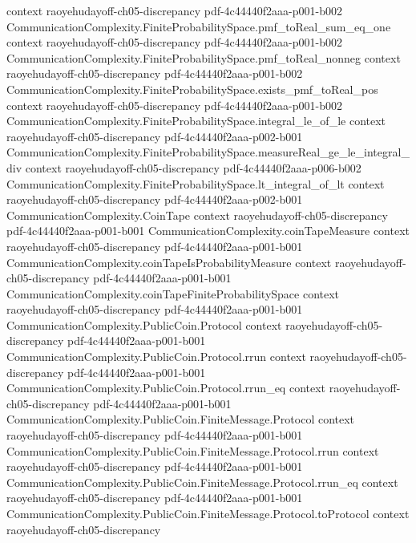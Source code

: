 \begin{theorem}
  {context}
  {raoyehudayoff-ch05-discrepancy}
  {pdf-4c44440f2aaa-p001-b002}
\proofstep
  {CommunicationComplexity.FiniteProbabilitySpace.pmf_toReal_sum_eq_one}
  {context}
  {raoyehudayoff-ch05-discrepancy}
  {pdf-4c44440f2aaa-p001-b002}
\proofstep
  {CommunicationComplexity.FiniteProbabilitySpace.pmf_toReal_nonneg}
  {context}
  {raoyehudayoff-ch05-discrepancy}
  {pdf-4c44440f2aaa-p001-b002}
\proofstep
  {CommunicationComplexity.FiniteProbabilitySpace.exists_pmf_toReal_pos}
  {context}
  {raoyehudayoff-ch05-discrepancy}
  {pdf-4c44440f2aaa-p001-b002}
\proofstep
  {CommunicationComplexity.FiniteProbabilitySpace.integral_le_of_le}
  {context}
  {raoyehudayoff-ch05-discrepancy}
  {pdf-4c44440f2aaa-p002-b001}
\proofstep
  {CommunicationComplexity.FiniteProbabilitySpace.measureReal_ge_le_integral_div}
  {context}
  {raoyehudayoff-ch05-discrepancy}
  {pdf-4c44440f2aaa-p006-b002}
\proofstep
  {CommunicationComplexity.FiniteProbabilitySpace.lt_integral_of_lt}
  {context}
  {raoyehudayoff-ch05-discrepancy}
  {pdf-4c44440f2aaa-p002-b001}
\proofstep
  {CommunicationComplexity.CoinTape}
  {context}
  {raoyehudayoff-ch05-discrepancy}
  {pdf-4c44440f2aaa-p001-b001}
\proofstep
  {CommunicationComplexity.coinTapeMeasure}
  {context}
  {raoyehudayoff-ch05-discrepancy}
  {pdf-4c44440f2aaa-p001-b001}
\proofstep
  {CommunicationComplexity.coinTapeIsProbabilityMeasure}
  {context}
  {raoyehudayoff-ch05-discrepancy}
  {pdf-4c44440f2aaa-p001-b001}
\proofstep
  {CommunicationComplexity.coinTapeFiniteProbabilitySpace}
  {context}
  {raoyehudayoff-ch05-discrepancy}
  {pdf-4c44440f2aaa-p001-b001}
\proofstep
  {CommunicationComplexity.PublicCoin.Protocol}
  {context}
  {raoyehudayoff-ch05-discrepancy}
  {pdf-4c44440f2aaa-p001-b001}
\proofstep
  {CommunicationComplexity.PublicCoin.Protocol.rrun}
  {context}
  {raoyehudayoff-ch05-discrepancy}
  {pdf-4c44440f2aaa-p001-b001}
\proofstep
  {CommunicationComplexity.PublicCoin.Protocol.rrun_eq}
  {context}
  {raoyehudayoff-ch05-discrepancy}
  {pdf-4c44440f2aaa-p001-b001}
\proofstep
  {CommunicationComplexity.PublicCoin.FiniteMessage.Protocol}
  {context}
  {raoyehudayoff-ch05-discrepancy}
  {pdf-4c44440f2aaa-p001-b001}
\proofstep
  {CommunicationComplexity.PublicCoin.FiniteMessage.Protocol.rrun}
  {context}
  {raoyehudayoff-ch05-discrepancy}
  {pdf-4c44440f2aaa-p001-b001}
\proofstep
  {CommunicationComplexity.PublicCoin.FiniteMessage.Protocol.rrun_eq}
  {context}
  {raoyehudayoff-ch05-discrepancy}
  {pdf-4c44440f2aaa-p001-b001}
\proofstep
  {CommunicationComplexity.PublicCoin.FiniteMessage.Protocol.toProtocol}
  {context}
  {raoyehudayoff-ch05-discrepancy}

\end{theorem}
